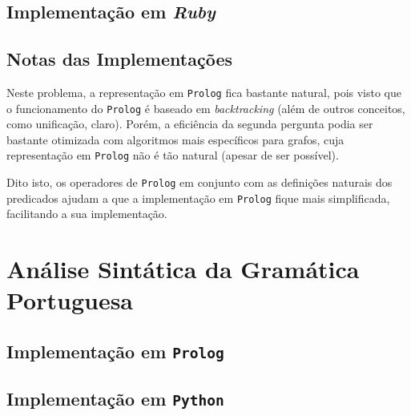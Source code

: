 \documentclass[12pt,a4paper,oneside]{article}
\begin{document}
\subsection{Implementação em \textit{Ruby}}

\lipsum[1]

\lipsum[2]

\lipsum[3]

\subsection{Notas das Implementações}

Neste problema, a representação em \texttt{Prolog} fica bastante
natural, pois visto que o funcionamento do \texttt{Prolog} é baseado
em \textit{backtracking} (além de outros conceitos, como unificação,
claro). Porém, a eficiência da segunda pergunta podia ser bastante
otimizada com algoritmos mais específicos para grafos, cuja
representação em \texttt{Prolog} não é tão natural (apesar de ser
possível).

Dito isto, os operadores de \texttt{Prolog} em conjunto com as
definições naturais dos predicados ajudam a que a implementação em
\texttt{Prolog} fique mais simplificada, facilitando a sua
implementação.


\section{Análise Sintática da Gramática Portuguesa}
\label{sec:sin}

\lipsum[1]

\subsection{Implementação em \texttt{Prolog}}

\lipsum[1]

\lipsum[2]

\lipsum[3]

\subsection{Implementação em \texttt{Python}}

\lipsum[1]

\lipsum[2]
\end{document}
